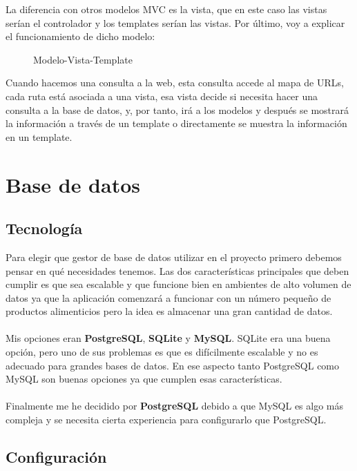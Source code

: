 La diferencia con otros modelos MVC es la vista, que en este caso las vistas serían el controlador y los templates serían las vistas.
Por último, voy a explicar el funcionamiento de dicho modelo:

\begin{figure}[H]
  \centering
  \noindent{}
  \caption{Modelo-Vista-Template}
\end{figure}

Cuando hacemos una consulta a la web, esta consulta accede al mapa de URLs, cada ruta está asociada a una vista, 
esa vista decide si necesita hacer una consulta a la base de datos, y, por tanto, irá a los modelos y después se 
mostrará la información a través de un template o directamente se muestra la información en un template.

\section{Base de datos} \label{sec:base_datos}

\subsection{Tecnología}

Para elegir que gestor de base de datos utilizar en el proyecto primero debemos pensar en qué necesidades tenemos.
Las dos características principales que deben cumplir es que sea escalable y que funcione bien en ambientes de alto volumen 
de datos ya que la aplicación comenzará a funcionar con un número pequeño de productos alimenticios pero la idea es almacenar una gran cantidad de datos.\\ \\
Mis opciones eran \textbf{PostgreSQL}, \textbf{SQLite} y \textbf{MySQL}.
SQLite era una buena opción, pero uno de sus problemas es que es difícilmente escalable y no es adecuado para grandes bases de datos.
En ese aspecto tanto PostgreSQL como MySQL son buenas opciones ya que cumplen esas características.\\ \\

Finalmente me he decidido por \textbf{PostgreSQL} debido a que MySQL es algo más compleja y se necesita cierta experiencia para configurarlo que PostgreSQL.

\subsection{Configuración}

